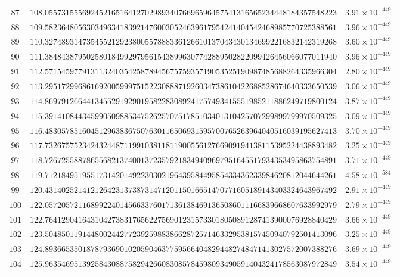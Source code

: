 \documentclass[12pt,reqno]{amsart}
\theoremstyle{remark}
\begin{document}
\begin{longtable}{clc}
$87$ & $108.0557315556924521651641270298934076696596457541316565234448184357548223$ & $3.91\times 10^{-449}$ \\
$88$ & $109.5823648056303496341839214760030524639617954241404542468985770725388561$ & $3.96\times 10^{-449}$ \\
$89$ & $110.3274893147354552129238005578883361266101370434301346992216832142319268$ & $3.60\times 10^{-449}$ \\
$90$ & $111.3848438795025801849929795615438996307742889502822099426456066077011940$ & $3.96\times 10^{-449}$ \\
$91$ & $112.5715459779131132403542587894567575935719053525190987485688264335966304$ & $2.80\times 10^{-449}$ \\
$92$ & $113.2951729968616920059997515223088871926034738610422688528674640333650539$ & $3.06\times 10^{-449}$ \\
$93$ & $114.8697912664413455291929019582283089241757493415551985211886249719800124$ & $3.87\times 10^{-449}$ \\
$94$ & $115.3914108443459905098853475262570751785103401310425707299899799970509325$ & $3.09\times 10^{-449}$ \\
$95$ & $116.4830578516045129638367507630116506931595700765263964040516039195627413$ & $3.70\times 10^{-449}$ \\
$96$ & $117.7326757523424324487119910381181190055612766909194138115395224438893482$ & $3.25\times 10^{-449}$ \\
$97$ & $118.7267255887865568213740013723579218349409697951645517934353495863754891$ & $3.71\times 10^{-449}$ \\
$98$ & $119.7121849519551731420149223030219643958449585433436233984620812044644261$ & $4.58\times 10^{-584}$ \\
$99$ & $120.4314025214121264231373873147120115016651470771605189143403324643967492$ & $2.91\times 10^{-449}$ \\
$100$ & $122.0572057211689922401456633760171361384691365086011166839668607633992979$ & $2.79\times 10^{-449}$ \\
$101$ & $122.7641290416431042738317656227569012315733018050891287413900076928840429$ & $3.66\times 10^{-449}$ \\
$102$ & $123.5048501191448002442772392598838662872571463329538157450940792501413096$ & $3.25\times 10^{-449}$ \\
$103$ & $124.8936653501878793690102059046377595664048294482748471413027572007388276$ & $3.69\times 10^{-449}$ \\
$104$ & $125.9635469513925843088758294266083085784598093490591404324178563087972849$ & $3.54\times 10^{-449}$ \\

\end{longtable}
\end{document}
